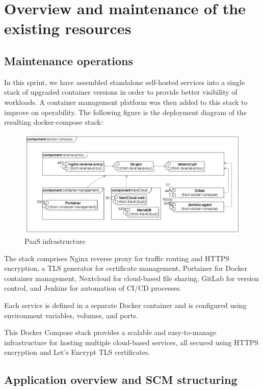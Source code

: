 \section{Overview and maintenance of the existing resources}
\subsection{Maintenance operations}

In this sprint, we have assembled standalone self-hosted services into a single stack of upgraded container versions in order to provide better visibility of workloads. A container management platform was then added to this stack to improve on operability. 
The following figure is the deployment diagram of the resulting docker-compose stack:

 \begin{figure}[H] 
\includegraphics[width=1.0\textwidth,angle=00]{assets/f9.jpg}
\caption{PaaS infrastructure}
\label{fig:f9}
\end{figure}

The stack comprises Nginx reverse proxy for traffic routing and HTTPS encryption, a TLS generator for certificate management, Portainer for Docker container management, Nextcloud for cloud-based file sharing, GitLab for version control, and Jenkins for automation of CI/CD processes.

Each service is defined in a separate Docker container and is configured using environment variables, volumes, and ports.

This Docker Compose stack provides a scalable and easy-to-manage infrastructure for hosting multiple cloud-based services, all secured using HTTPS encryption and Let's Encrypt TLS certificates. 

\newpage

\subsection{Application overview and SCM structuring}

